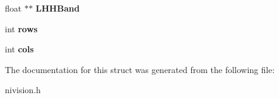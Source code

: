 \begin{DoxyCompactItemize}
\item 
\hypertarget{structWaveletBandsReport__struct_af14006527f56389f35664e4c789fef4b}{
float $\ast$$\ast$ {\bfseries LHHBand}}
\label{structWaveletBandsReport__struct_af14006527f56389f35664e4c789fef4b}

\item 
\hypertarget{structWaveletBandsReport__struct_af10bfb136a0a5dab29a77c5552cd9ddc}{
int {\bfseries rows}}
\label{structWaveletBandsReport__struct_af10bfb136a0a5dab29a77c5552cd9ddc}

\item 
\hypertarget{structWaveletBandsReport__struct_acd4bc2c3e323b24fe900a92fd330327d}{
int {\bfseries cols}}
\label{structWaveletBandsReport__struct_acd4bc2c3e323b24fe900a92fd330327d}

\end{DoxyCompactItemize}


The documentation for this struct was generated from the following file:\begin{DoxyCompactItemize}
\item 
nivision.h\end{DoxyCompactItemize}
